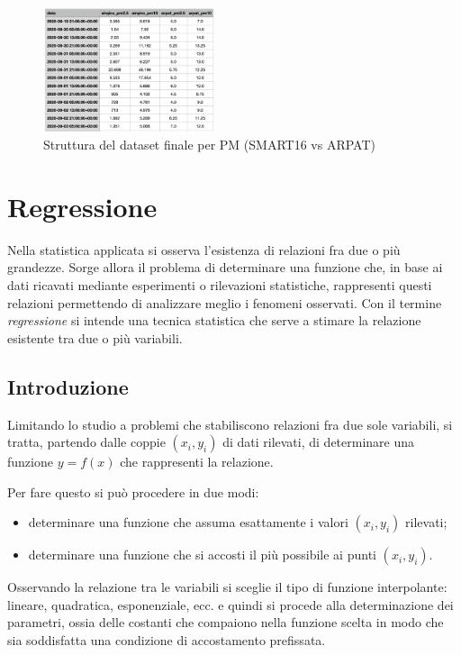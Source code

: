 \begin{figure}[H]
\centering
\captionsetup{justification=centering}
\includegraphics[width=0.45\textwidth,height=\textheight,keepaspectratio]{img/pm_ds_final}
\caption{Struttura del dataset finale per PM (SMART16 vs ARPAT)}
\label{fig:pm-ds-final}
\end{figure}

\section{Regressione}\label{sec:regressione}
Nella statistica applicata si osserva l’esistenza di relazioni fra due o più grandezze. Sorge allora il problema di determinare una funzione che, in base ai dati ricavati mediante esperimenti o rilevazioni statistiche, rappresenti questi relazioni permettendo di analizzare meglio i fenomeni osservati. 
Con il termine \textit{regressione} si intende una tecnica statistica che serve a stimare la relazione esistente tra due o più variabili.

\subsection{Introduzione}\label{ssec:regressione-introduzione}
Limitando lo studio a problemi che stabiliscono relazioni fra due sole variabili, si tratta, partendo dalle coppie $(x_i, y_i)$ di dati rilevati, di determinare una funzione $y=f(x)$ che rappresenti la relazione.

Per fare questo si può procedere in due modi:

\begin{itemize}
  \item determinare una funzione che assuma esattamente i valori $(x_i, y_i)$ rilevati;
  \item determinare una funzione che si accosti il più possibile ai punti $(x_i, y_i)$.
\end{itemize}

Osservando la relazione tra le variabili si sceglie il tipo di funzione interpolante: lineare, quadratica, esponenziale, ecc. e quindi si procede alla determinazione dei parametri, ossia delle costanti che compaiono nella funzione scelta in modo che sia soddisfatta una condizione di accostamento prefissata.

